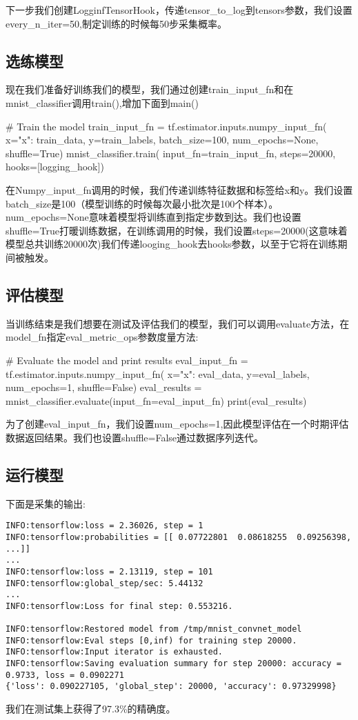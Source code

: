 下一步我们创建LogginfTensorHook，传递tensor\_to\_log到tensors参数，我们设置every\_n\_iter=50,制定训练的时候每50步采集概率。
\subsection{选练模型}
现在我们准备好训练我们的模型，我们通过创建train\_input\_fn和在mnist\_classifier调用train(),增加下面到main()
\begin{python}
# Train the model
train_input_fn = tf.estimator.inputs.numpy_input_fn(
    x={"x": train_data},
    y=train_labels,
    batch_size=100,
    num_epochs=None,
    shuffle=True)
mnist_classifier.train(
    input_fn=train_input_fn,
    steps=20000,
    hooks=[logging_hook])
\end{python}
在Numpy\_input\_fn调用的时候，我们传递训练特征数据和标签给x和y。我们设置batch\_size是100（模型训练的时候每次最小批次是100个样本）。num\_epochs=None意味着模型将训练直到指定步数到达。我们也设置shuffle=True打暖训练数据，在训练调用的时候，我们设置steps=20000(这意味着模型总共训练20000次)我们传递looging\_hook去hooks参数，以至于它将在训练期间被触发。
\subsection{评估模型}
当训练结束是我们想要在测试及评估我们的模型，我们可以调用evaluate方法，在model\_fn指定eval\_metric\_ops参数度量方法:
\begin{python}
# Evaluate the model and print results
eval_input_fn = tf.estimator.inputs.numpy_input_fn(
    x={"x": eval_data},
    y=eval_labels,
    num_epochs=1,
    shuffle=False)
eval_results = mnist_classifier.evaluate(input_fn=eval_input_fn)
print(eval_results)
\end{python}
为了创建eval\_input\_fn，我们设置num\_epochs=1,因此模型评估在一个时期评估数据返回结果。我们也设置shuffle=False通过数据序列迭代。
\subsection{运行模型}
下面是采集的输出:
\begin{lstlisting}
INFO:tensorflow:loss = 2.36026, step = 1
INFO:tensorflow:probabilities = [[ 0.07722801  0.08618255  0.09256398, ...]]
...
INFO:tensorflow:loss = 2.13119, step = 101
INFO:tensorflow:global_step/sec: 5.44132
...
INFO:tensorflow:Loss for final step: 0.553216.

INFO:tensorflow:Restored model from /tmp/mnist_convnet_model
INFO:tensorflow:Eval steps [0,inf) for training step 20000.
INFO:tensorflow:Input iterator is exhausted.
INFO:tensorflow:Saving evaluation summary for step 20000: accuracy = 0.9733, loss = 0.0902271
{'loss': 0.090227105, 'global_step': 20000, 'accuracy': 0.97329998}
\end{lstlisting}
我们在测试集上获得了97.3\%的精确度。

